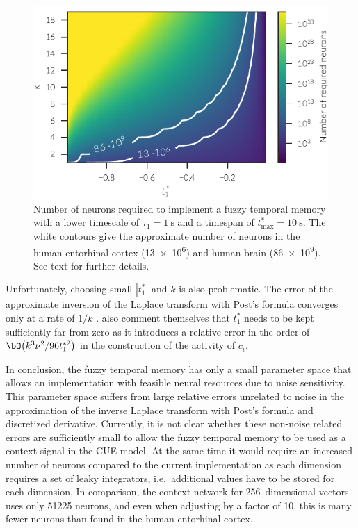 \begin{figure}
    \centering
    \includegraphics{figures/fuzzy-mem-n-neurons}
    \caption[Number of neurons required to implement a fuzzy temporal memory.]{Number of neurons required to implement a fuzzy temporal memory with a lower timescale of $\tau_1 = \SI{1}{\second}$ and a timespan of $t^*_{\max} = \SI{10}{\second}$. The white contours give the approximate number of neurons in the human entorhinal cortex (\num{13e6}) and human brain (\num{86e9}). See text for further details.}\label{fig:fuzzy-mem-n-neurons}
\end{figure}

Unfortunately, choosing small $|t^*_1|$ and $k$ is also problematic.
The error of the approximate inversion of the Laplace transform with Post's formula converges only at a rate of $1/k$ \parencite{vukimtuan2000}.
\Textcite{shankar2013} also comment themselves that $t^*_1$ needs to be kept sufficiently far from zero as it introduces a relative error in the order of $\bO\big(k^3\nu^2/96 t^{*2}_1\big)$ in the construction of the activity of $c_i$.

In conclusion, the fuzzy temporal memory has only a small parameter space that allows an implementation with feasible neural resources due to noise sensitivity.
This parameter space suffers from large relative errors unrelated to noise in the approximation of the inverse Laplace transform with Post's formula and discretized derivative.
Currently, it is not clear whether these non-noise related errors are sufficiently small to allow the fuzzy temporal memory to be used as a context signal in the CUE model.
At the same time it would require an increased number of neurons compared to the current implementation as each dimension requires a set of leaky integrators, i.e.\ additional values have to be stored for each dimension.
In comparison, the context network for \num{256}~dimensional vectors uses only \num{51225} neurons, and even when adjusting by a factor of \num{10}, this is many fewer neurons than found in the human entorhinal cortex.

